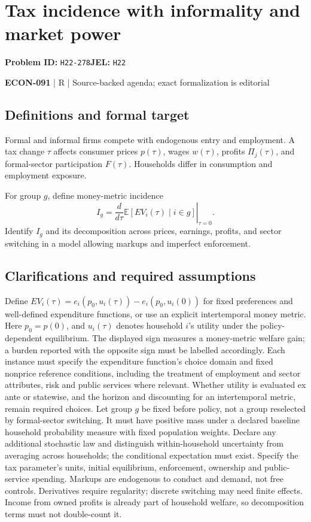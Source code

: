 \documentclass[11pt,a4paper]{article}
\begin{document}
\section*{Tax incidence with informality and market power}
\textbf{Problem ID:} \texttt{H22-278}\quad \textbf{JEL:} \texttt{H22}\par
\label{problem:OP-0650}


\label{audited:ECON-091}

{\sffamily\small\color{muted}\textbf{ECON-091} | R | Source-backed agenda; exact formalization is editorial\par}

\subsection*{Definitions and formal target}

Formal and informal firms compete with endogenous entry and employment. A tax change $\tau$ affects consumer prices $p(\tau)$, wages $w(\tau)$, profits $\Pi_j(\tau)$, and formal-sector participation $F(\tau)$. Households differ in consumption and employment exposure.

For group $g$, define money-metric incidence
\[
 I_g=\left.\frac{d}{d\tau}\mathbb E[EV_i(\tau)\mid i\in g]\right|_{\tau=0}.
\]
Identify $I_g$ and its decomposition across prices, earnings, profits, and sector switching in a model allowing markups and imperfect enforcement.

\subsection*{Clarifications and required assumptions}

Define \(EV_i(\tau)=e_i(p_0,u_i(\tau))-e_i(p_0,u_i(0))\) for fixed preferences and well-defined expenditure functions, or use an explicit intertemporal money metric. Here \(p_0=p(0)\), and \(u_i(\tau)\) denotes household \(i\)'s utility under the policy-dependent equilibrium. The displayed sign measures a money-metric welfare gain; a burden reported with the opposite sign must be labelled accordingly. Each instance must specify the expenditure function's choice domain and fixed nonprice reference conditions, including the treatment of employment and sector attributes, risk and public services where relevant. Whether utility is evaluated ex ante or statewise, and the horizon and discounting for an intertemporal metric, remain required choices. Let group \(g\) be fixed before policy, not a group reselected by formal-sector switching. It must have positive mass under a declared baseline household probability measure with fixed population weights. Declare any additional stochastic law and distinguish within-household uncertainty from averaging across households; the conditional expectation must exist. Specify the tax parameter's units, initial equilibrium, enforcement, ownership and public-service spending. Markups are endogenous to conduct and demand, not free controls. Derivatives require regularity; discrete switching may need finite effects. Income from owned profits is already part of household welfare, so decomposition terms must not double-count it.
\end{document}
